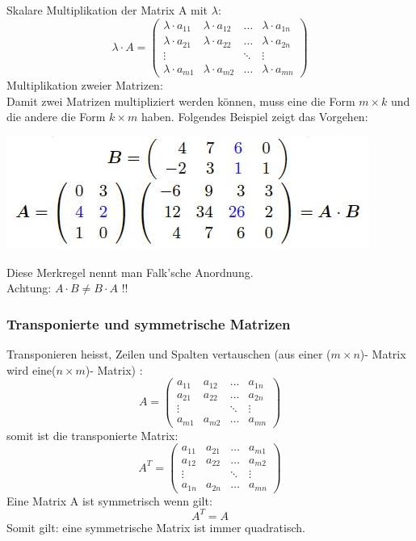 \documentclass[10pt]{scrartcl}
\begin{document}
\begin{multicols}{2}
\begin{equation}
\end{equation}
Skalare Multiplikation der Matrix A mit $\lambda$:
\begin{equation}
\lambda \cdot A = \begin{pmatrix}
\lambda \cdot a_{11} & \lambda \cdot a_{12} & \dots & \lambda \cdot a_{1n}\\
\lambda \cdot a_{21} & \lambda \cdot a_{22} & \dots & \lambda \cdot a_{2n}\\
\vdots & & \ddots & \vdots\\
\lambda \cdot a_{m1} & \lambda \cdot a_{m2} & \dots & \lambda \cdot a_{mn}
\end{pmatrix}
\end{equation}
Multiplikation zweier Matrizen:\\
Damit zwei Matrizen multipliziert werden können, muss eine die Form $m \times k$ und die andere die Form $k \times m$ haben. Folgendes Beispiel zeigt das Vorgehen:
\begin{center}
\includegraphics[scale=0.6]{images/falkscheanordnung.jpg}
\end{center}
Diese Merkregel nennt man Falk'sche Anordnung.\\
Achtung: $A \cdot B \neq B \cdot A$ !!
\subsubsection*{Transponierte und symmetrische Matrizen}
Transponieren heisst, Zeilen und Spalten vertauschen (aus einer ($m \times n$)- Matrix wird eine($n \times m$)- Matrix) :
\begin{equation}
A = \begin{pmatrix}
a_{11} & a_{12} & \dots & a_{1n}\\
a_{21} & a_{22} & \dots & a_{2n}\\
\vdots & & \ddots & \vdots\\
a_{m1} & a_{m2} & \dots & a_{mn}
\end{pmatrix}
\end{equation} somit ist die transponierte Matrix:
\begin{equation}
A^{T} = \begin{pmatrix}
a_{11} & a_{21} & \dots & a_{m1}\\
a_{12} & a_{22} & \dots & a_{m2}\\
\vdots & & \ddots & \vdots\\
a_{1n} & a_{2n} & \dots & a_{mn}
\end{pmatrix}
\end{equation}
Eine Matrix A ist symmetrisch wenn gilt:
\begin{equation}
A^{T} = A
\end{equation}
Somit gilt: eine symmetrische Matrix ist immer quadratisch.

\end{multicols}
\end{document}
